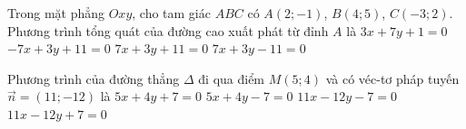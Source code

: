 \begin{ex}%
	Trong  mặt phẳng $Oxy$, cho tam giác $ABC$ có $A(2;-1)$, $B(4;5)$, $C(-3; 2)$. Phương trình tổng quát của đường cao xuất phát từ đỉnh $A$ là
	\choice 
		 {$3x+7y+1=0$}
		{$-7x+3y+11=0$} 
		{$7x+3y+11=0$} 
		{\True  $7x+3y-11=0$}
\end{ex}

\begin{ex}%
	Phương trình  của đường thẳng $\Delta$ đi qua điểm $M(5;4)$ và có véc-tơ pháp tuyến $\overrightarrow{n}=(11;-12)$ là
	 \choice
		 {$5x+4y+7=0$}
		 {$5x+4y-7=0$}
		 {\True $11x-12y-7=0$}
		 {$11x-12y+7=0$}
\end{ex}



